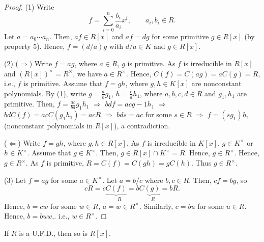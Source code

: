 \documentclass[twoside]{article}
\theoremstyle{remark}
\newcounter{theorem}
\begin{document}
\begin{proof}
  (1) Write
  \[ f = \sum_{i=0}^n \frac{b_i}{a_i} x^i, \qquad a_i, b_i \in R. \]
  Let \(a = a_0 \cdots a_n\). Then, \(af \in R[x]\) and \(af = dg\) for some primitive \(g \in R[x]\) (by property 5). Hence, \(f = (d/a)g\) with \(d/a \in K\) and \(g \in R[x]\).
  
  (2) (\(\Rightarrow\)) Write \(f = ag\), where \(a \in R\), \(g\) is primitive. As \(f\) is irreducible in \(R[x]\) and \((R[x])^\times = R^\times\), we have \(a \in R^\times\). Hence, \(C(f) = C(ag) = aC(g) = R\), i.e., \(f\) is primitive. Assume that \(f = gh\), where \(g,h \in K[x]\) are nonconstant polynomials. By (1), write \(g = \frac ab g_1\), \(h = \frac cd h_1\), where \(a,b,c,d \in R\) and \(g_1, h_1\) are primitive. Then, \(f = \frac{ac}{bd} g_1h_1\) \(\Rightarrow\) \(bdf = acg-1h_1\) \(\Rightarrow\) \(bd C(f) = ac C(g_1h_1) = acR\) \(\Rightarrow\) \(bds = ac\) for some \(s \in R\) \(\Rightarrow\) \(f = (sg_1) h_1\) (nonconstant polynomials in \(R[x]\)), a contradiction.
  
  (\(\Leftarrow\)) Write \(f = gh\), where \(g,h \in R[x]\). As \(f\) is irreducible in \(K[x]\), \(g \in K^\times\) or \(h \in K^\times\). Assume that \(g \in K^\times\). Then, \(g \in R[x] \cap K^\times = R\). Hence, \(g \in R^\times\). Hence, \(g \in R^\times\). As \(f\) is primitive, \(R = C(f) = C(gh) = gC(h)\). Thus \(g \in R^\times\).
  
  (3) Let \(f = ag\) for some \(a \in K^\times\). Let \(a = b/c\) where \(b,c \in R\). Then, \(cf = bg\), so
  \[ cR = c \underbrace{C(f)}_{=R} = b \underbrace{C(g)}_{=R} = bR. \]
  Hence, \(b = cw\) for some \(w \in R\), \(a = w \in R^\times\). Similarly, \(c = bu\) for some \(u \in R\). Hence, \(b = buw\),. i.e., \(w \in R^\times\).
\end{proof}

\begin{theorem}
  If \(R\) is a U.F.D., then so is \(R[x]\).
\end{theorem}
\end{document}
